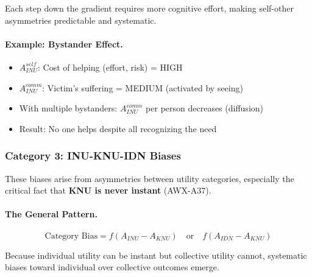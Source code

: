 Each step down the gradient requires more cognitive effort, making 
self-other asymmetries predictable and systematic.

\paragraph{Example: Bystander Effect.}
\begin{itemize}
\item $A^{self}_{INU}$: Cost of helping (effort, risk) = HIGH
\item $A^{comm}_{INU}$: Victim's suffering = MEDIUM (activated by seeing)
\item With multiple bystanders: $A^{comm}_{INU}$ per person decreases (diffusion)
\item Result: No one helps despite all recognizing the need
\end{itemize}

\subsubsection{Category 3: INU-KNU-IDN Biases}

These biases arise from asymmetries between utility categories, especially
the critical fact that \textbf{KNU is never instant} (AWX-A37).

\paragraph{The General Pattern.}
\begin{equation}
\text{Category Bias} = f(A_{INU} - A_{KNU}) \quad \text{or} \quad f(A_{IDN} - A_{KNU})
\end{equation}

Because individual utility can be instant but collective utility cannot,
systematic biases toward individual over collective outcomes emerge.

